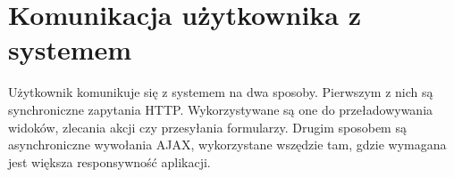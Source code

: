 \begin{comment}
Metody bazowej klasy DAO zwracają obiekty trwałe. Powoduje to często niepotrzebny narzut wydajnościowy. Rozwiązaniem tego problemu jest wykorzystanie, niepowiązanych z sesją Hibernate, obiektów POJO (ang. \textit{Plain Old Java Object}). Wydruk \ref{pojo} zawiera metodę DAO zwracającą listę obiektów POJO opisujących umowę. Metoda ta dokonuje złączenia tabel już na etapie zapytania HQL.

\begin{lstlisting}[language=Java,style=outcode,showstringspaces=false,caption=Metoda DAO zwracająca listę obiektów POJO opisujących umowę,label={pojo}]
public class UmowaDao extends AbstractDao<String, Umowa> {

	public static final String SIMPLE_UMOWA_POJO = 
		"pl.waw.mizinski.umowy.pojo.SimpleUmowaPOJO("
		+ "u.nrUmowy, u.typUmowy.nazwa, p.nazwisko, p.pierwszeImie, " +
		"p.imionaPozostale, z.typZadania.typZadaniaPK.jednostkaOrganizacyjna.nazwa,"
		+ "z.nazwa, u.wynagrodzenie, count(r.rachunekPK.nrRachunku))";

	...

	public List<SimpleUmowaPOJO> getAllSimpleUmowaPOJOs() {
		Query query = session().createQuery("select new " + SIMPLE_UMOWA_POJO +
			"from Rachunek r right join r.rachunekPK.umowa u left join u.pracownik p"
			+ " left join u.zadanie z group by u.nrUmowy, p.id, z.id");
		return HibernateUtils.queryResult(session(), query);
	}
	
	...
}
\end{lstlisting}

Jak łatwo zauważyć obiekty POJO nadają się jedynie od odczytu danych. Zapis oraz modyfikacja odbywają się już przy użyciu obiektów trwałych. Najczęstszym zastosowaniem obiektów POJO w aplikacji jest przekazywanie ich do mechanizmu Velocity w celu przygotowania widoku.

\end{comment}

\section[Komunikacja użytkownika z systemem][Komunikacja użytkownika z systemem]{Komunikacja użytkownika z systemem}
Użytkownik komunikuje się z systemem na dwa sposoby. Pierwszym z nich są synchroniczne zapytania HTTP. Wykorzystywane są one do przeładowywania widoków, zlecania akcji czy przesyłania formularzy. Drugim sposobem są asynchroniczne wywołania AJAX, wykorzystane wszędzie tam, gdzie wymagana jest większa responsywność aplikacji.


